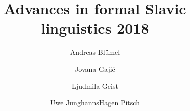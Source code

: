 \title{Advances in formal Slavic linguistics 2018}
\author{Andreas Blümel\and Jovana Gajić\and Ljudmila Geist\and Uwe Junghanns\lastand Hagen Pitsch}
\renewcommand{\lsSeries}{rcg}%
\renewcommand{\lsSeriesNumber}{1}
